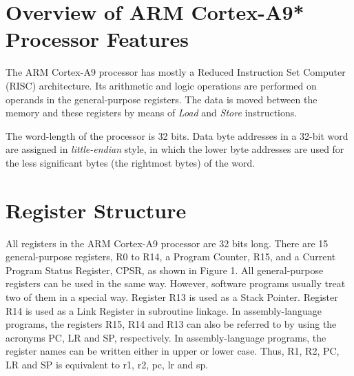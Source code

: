 \documentclass[11pt, twoside, pdftex]{article}
\begin{document}
\section{Overview of ARM Cortex-A9* Processor Features}
The ARM Cortex-A9 processor has mostly a Reduced Instruction Set Computer (RISC) architecture.
Its arithmetic and logic operations are performed on operands in the general-purpose
registers. The data is moved between the memory and these registers by means of {\it Load}
and {\it Store} instructions.

The word-length of the processor is 32 bits. Data byte addresses in a 32-bit word 
are assigned in {\it little-endian} style, 
in which the lower byte addresses are used for the less
significant bytes (the rightmost bytes) of the word. 

\section{Register Structure}
All registers in the ARM Cortex-A9 processor are 32 bits long.
There are 15 general-purpose registers, R0 to R14,
a Program Counter, R15, and a Current Program Status
Register, CPSR, as shown in Figure 1.
All general-purpose registers can be used in the same way. 
However, software programs usually treat two of them in a special 
way. Register R13 is used as a Stack Pointer.
Register R14 is used as a Link Register in subroutine linkage.
In assembly-language programs, the registers
R15, R14 and R13 can also be referred to by using the acronyms
PC, LR and SP, respectively. In assembly-language programs, the
register names can be written either in upper or lower case.
Thus, R1, R2, PC, LR and SP is equivalent to r1, r2, pc, lr and
sp.
\end{document}
